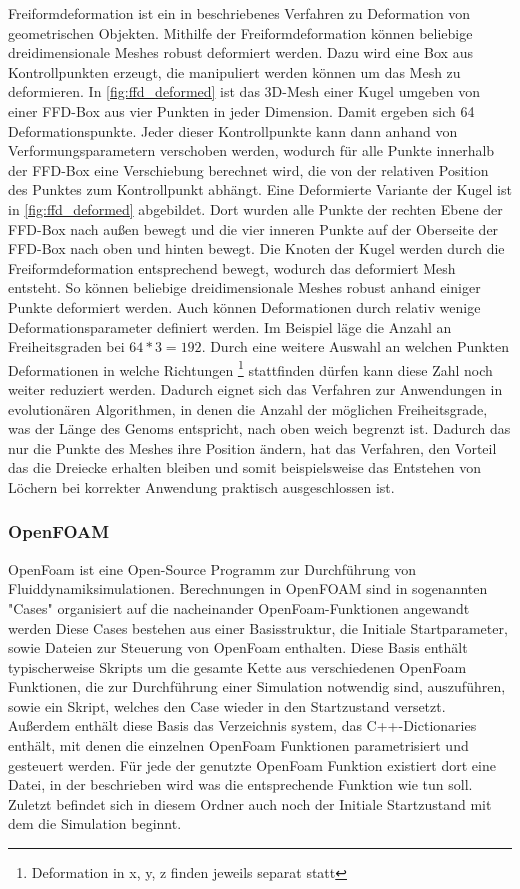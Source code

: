 Freiformdeformation ist ein in \cite{Sederberg.1986} beschriebenes Verfahren zu Deformation von geometrischen Objekten.
Mithilfe der Freiformdeformation können beliebige dreidimensionale Meshes robust deformiert werden.
Dazu wird eine Box aus Kontrollpunkten erzeugt, die manipuliert werden können um das Mesh zu deformieren.
In \cref{fig:ffd_deformed} ist das 3D-Mesh einer Kugel umgeben von einer FFD-Box aus vier Punkten in jeder Dimension.
Damit ergeben sich 64 Deformationspunkte.
Jeder dieser Kontrollpunkte kann dann anhand von Verformungsparametern verschoben werden, wodurch für alle Punkte innerhalb der FFD-Box eine Verschiebung berechnet wird, die von der relativen Position des Punktes zum Kontrollpunkt abhängt.
Eine Deformierte Variante der Kugel ist in \cref{fig:ffd_deformed} abgebildet.
Dort wurden alle Punkte der rechten Ebene der FFD-Box nach außen bewegt und die vier inneren Punkte auf der Oberseite der FFD-Box nach oben und hinten bewegt.
Die Knoten der Kugel werden durch die Freiformdeformation entsprechend bewegt, wodurch das deformiert Mesh entsteht.
So können beliebige dreidimensionale Meshes robust anhand einiger Punkte deformiert werden.
Auch können Deformationen durch relativ wenige Deformationsparameter definiert werden.
Im Beispiel läge die Anzahl an Freiheitsgraden bei $64 * 3 = 192$.
Durch eine weitere Auswahl an welchen Punkten Deformationen in welche Richtungen 
\footnote{Deformation in x, y, z finden jeweils separat statt}
stattfinden dürfen kann diese Zahl noch weiter reduziert werden.
Dadurch eignet sich das Verfahren zur Anwendungen in evolutionären Algorithmen, in denen die Anzahl der möglichen Freiheitsgrade, was der Länge des Genoms entspricht, nach oben weich begrenzt ist.
Dadurch das nur die Punkte des Meshes ihre Position ändern, hat das Verfahren, den Vorteil das die Dreiecke erhalten bleiben und somit beispielsweise das Entstehen von Löchern bei korrekter Anwendung praktisch ausgeschlossen ist.

\subsubsection{OpenFOAM}
\label{sub:openfoam}
OpenFoam \cite{OpenCFD.} ist eine Open-Source Programm zur Durchführung von Fluiddynamiksimulationen.
Berechnungen in OpenFOAM sind in sogenannten "Cases" organisiert auf die nacheinander OpenFoam-Funktionen angewandt werden
Diese Cases bestehen aus einer Basisstruktur, die Initiale Startparameter, sowie Dateien zur Steuerung von OpenFoam enthalten.
Diese Basis enthält typischerweise Skripts um die gesamte Kette aus verschiedenen OpenFoam Funktionen, die zur Durchführung einer Simulation notwendig sind, auszuführen, sowie ein Skript, welches den Case wieder in den Startzustand versetzt.
Außerdem enthält diese Basis das Verzeichnis system, das C++-Dictionaries enthält, mit denen die einzelnen OpenFoam Funktionen parametrisiert und gesteuert werden.
Für jede der genutzte OpenFoam Funktion existiert dort eine Datei, in der beschrieben wird was die entsprechende Funktion wie tun soll. 
Zuletzt befindet sich in diesem Ordner auch noch der Initiale Startzustand mit dem die Simulation beginnt.

